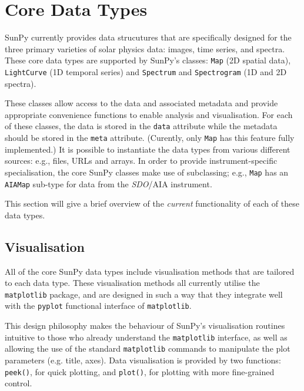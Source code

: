 \section{Core Data Types}\label{sec:DataTypes}

SunPy currently provides data strucutures that are specifically designed for the
three primary varieties of solar physics data: images, time series, and
spectra. These core data types are supported by SunPy's classes:
\texttt{Map} (2D spatial data), \texttt{LightCurve} (1D temporal series)
and \texttt{Spectrum} and \texttt{Spectrogram} (1D and 2D spectra). 

These classes allow access to the data
and associated metadata and provide appropriate convenience functions to
enable analysis and visualisation. For each of these classes, the data is
stored in the \texttt{data} attribute while the metadata should be stored 
in the \texttt{meta} attribute. (Curently, only \texttt{Map} has this feature 
fully implemented.) 
It is possible to instantiate the
data types from various
different sources: e.g., files, URLs and arrays.  
In order to provide instrument-specific specialisation, the core SunPy classes 
make use of subclassing; e.g., \texttt{Map} has an \texttt{AIAMap} 
sub-type for data from the \textit{SDO}/AIA instrument. 

This section will give a brief overview of the \textit{current} functionality 
of each of these data types.

\subsection{Visualisation}
\label{subsec:Viz}
All of the core SunPy data types 
include visualisation methods that are tailored to each data type. 
These visualisation methods all currently utilise the \texttt{matplotlib} 
package, and are designed in such a way that they integrate well with 
the \texttt{pyplot} functional interface of \texttt{matplotlib}.

This design philosophy makes the behaviour of SunPy's visualisation 
routines intuitive to those who already understand the \texttt{matplotlib}
interface, as well as allowing the use of the standard 
\texttt{matplotlib} commands to manipulate the plot parameters (e.g. title, axes).
Data visualisation is provided by two functions: \texttt{peek()}, for quick 
plotting, and \texttt{plot()}, for plotting with more fine-grained control.



